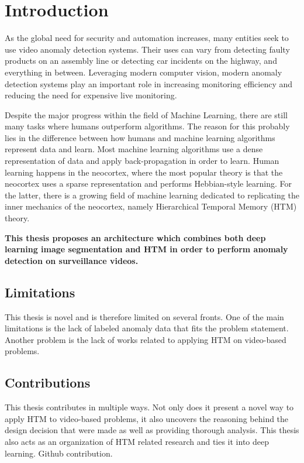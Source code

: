 \chapter{Introduction}
As the global need for security and automation increases, many entities seek to use video anomaly detection systems. Their uses can vary from detecting faulty products on an assembly line or detecting car incidents on the highway, and everything in between. Leveraging modern computer vision, modern anomaly detection systems play an important role in increasing monitoring efficiency and reducing the need for expensive live monitoring.\par
Despite the major progress within the field of Machine Learning, there are still many tasks where humans outperform algorithms. The reason for this probably lies in the difference between how humans and machine learning algorithms represent data and learn. Most machine learning algorithms use a dense representation of data and apply back-propagation in order to learn. Human learning happens in the neocortex, where the most popular theory is that the neocortex uses a sparse representation and performs Hebbian-style learning. For the latter, there is a growing field of machine learning dedicated to replicating the inner mechanics of the neocortex, namely Hierarchical Temporal Memory (HTM) theory. \par
\textbf{This thesis proposes an architecture which combines both deep learning image segmentation and HTM in order to perform anomaly detection on surveillance videos. }
\section{Limitations}
This thesis is novel and is therefore limited on several fronts. One of the main limitations is the lack of labeled anomaly data that fits the problem statement. Another problem is the lack of works related to applying HTM on video-based problems.
\section{Contributions}
This thesis contributes in multiple ways. Not only does it present a novel way to apply HTM to video-based problems, it also uncovers the reasoning behind the design decision that were made as well as providing thorough analysis. This thesis also acts as an organization of HTM related research and ties it into deep learning.
Github contribution.
